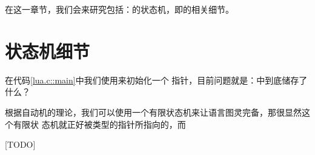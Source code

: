 


在这一章节，我们会来研究包括：的状态机，即的相关细节。

\section{状态机细节}

在代码\ref{lua.c::main}中我们使用来初始化一个%
指针，目前问题就是：中到底储存了什么？

根据自动机的理论，我们可以使用一个有限状态机来让语言图灵完备，那很显然这个有限状
态机就正好被类型的指针所指向的，而

[TODO]

